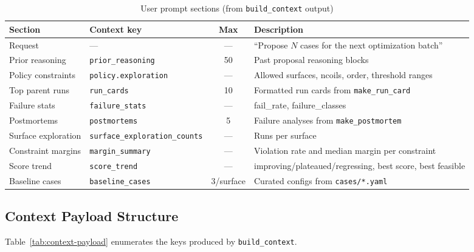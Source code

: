 \begin{table}[t]
  \centering
  \caption{User prompt sections (from \texttt{build\_context} output)}
  \label{tab:user-prompt}
  \begin{tabular}{@{}llcl@{}}
    \toprule
    \textbf{Section} & \textbf{Context key} & \textbf{Max} & \textbf{Description} \\
    \midrule
    Request & --- & --- & ``Propose $N$ cases for the next optimization batch'' \\
    Prior reasoning & \texttt{prior\_reasoning} & 50 & Past proposal reasoning blocks \\
    Policy constraints & \texttt{policy.exploration} & --- & Allowed surfaces, ncoils, order, threshold ranges \\
    Top parent runs & \texttt{run\_cards} & 10 & Formatted run cards from \texttt{make\_run\_card} \\
    Failure stats & \texttt{failure\_stats} & --- & fail\_rate, failure\_classes \\
    Postmortems & \texttt{postmortems} & 5 & Failure analyses from \texttt{make\_postmortem} \\
    Surface exploration & \texttt{surface\_exploration\_counts} & --- & Runs per surface \\
    Constraint margins & \texttt{margin\_summary} & --- & Violation rate and median margin per constraint \\
    Score trend & \texttt{score\_trend} & --- & improving/plateaued/regressing, best score, best feasible \\
    Baseline cases & \texttt{baseline\_cases} & 3/surface & Curated configs from \texttt{cases/*.yaml} \\
    \bottomrule
  \end{tabular}
\end{table}

\subsection{Context Payload Structure}

Table~\ref{tab:context-payload} enumerates the keys produced by \texttt{build\_context}.

